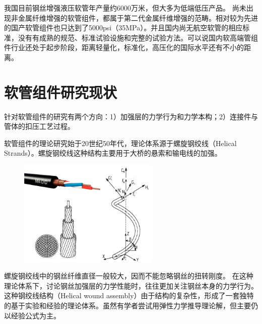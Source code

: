 \begin{figure}[!htbp]
	\centering
	\hspace{0.5cm}
	\label{fig:kevlarhose}
\end{figure}


我国目前钢丝增强液压软管年产量约6000万米\cite{xuhaitao2013}，但大多为低端低压产品。
尚未出现非金属纤维增强的软管组件，都属于第二代金属纤维增强的范畴。相对较为先进的国产软管组件也只达到了5000psi（35MPa）。并且国内尚无航空软管的相应标准，没有有成熟的规范、标准试验设施和完整的试验方法。可以说国内软高端管组件行业还处于起步阶段，距离轻量化，标准化，高压化的国际水平还有不小的距离。

\section{软管组件研究现状}
针对软管组件的研究有两个方向：1）加强层的力学行为和力学本构；2）连接件与管体的扣压工艺过程。

软管组件的理论研究始于20世纪50年代，理论体系源于螺旋钢绞线（Helical Strands）。螺旋钢绞线这种结构主要用于大桥的悬索和输电线的加强。
\begin{figure}[!htbp]
	\centering
	\includegraphics[width=0.6\textwidth]{figure/chap1/helical-strands}
	\label{fig:hose}
\end{figure}
螺旋钢绞线中的钢丝纤维直径一般较大，因而不能忽略钢丝的扭转刚度。
在这种理论体系下，讨论钢丝加强层的力学性能时，往往更加关注钢丝本身的力学行为。这种钢绞线结构（Helical wound assembly）由于结构的复杂性，形成了一套独特的基于实验和经验的理论体系\cite{Cardou1997}。虽然有学者尝试用弹性力学推导理论解\cite{phillips1972,machida1973}，但主要仍以经验公式为主。

